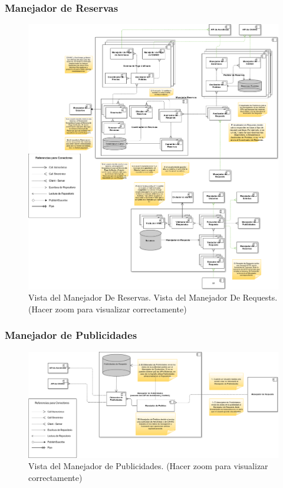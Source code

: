 \subsubsection{Manejador de Reservas}

\begin{figure}[H]
  \centering
  \includegraphics[width=\textwidth]{diagramas/ManejadorReservas.png}
  \caption{\normalfont Vista del Manejador De Reservas. Vista del Manejador De Requests. (Hacer zoom para visualizar correctamente)}
\end{figure} 

\subsubsection{Manejador de Publicidades}

\begin{figure}[H]
  \centering
  \includegraphics[width=\textwidth]{diagramas/ManejadorDePublicidades.png}
  \caption{\normalfont Vista del Manejador de Publicidades. (Hacer zoom para visualizar correctamente)}
\end{figure} 

